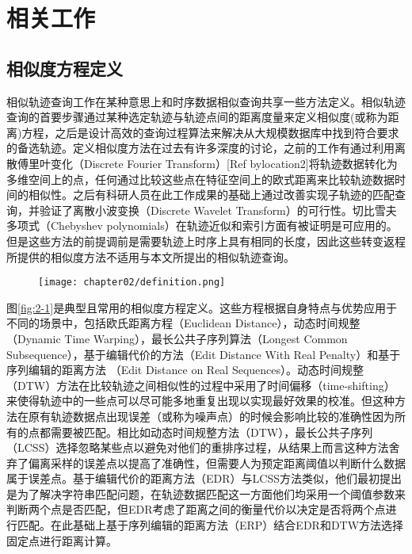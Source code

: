 
\chapter{ 相关工作 }
\label{chap:related}

\section{相似度方程定义}
\label{sec:similarityfunc}
相似轨迹查询工作在某种意思上和时序数据相似查询共享一些方法定义。相似轨迹查询的首要步骤通过某种选定轨迹与轨迹点间的距离度量来定义相似度(或称为距离)方程，之后是设计高效的查询过程算法来解决从大规模数据库中找到符合要求的备选轨迹。定义相似度方法在过去有许多深度的讨论，之前的工作有通过利用离散傅里叶变化（Discrete Fourier Transform）[Ref bylocation2]将轨迹数据转化为多维空间上的点，任何通过比较这些点在特征空间上的欧式距离来比较轨迹数据时间的相似性。之后有科研人员在此工作成果的基础上通过改善实现子轨迹的匹配查询，并验证了离散小波变换（Discrete Wavelet Transform）的可行性。切比雪夫多项式（Chebyshev polynomials）在轨迹近似和索引方面有被证明是可应用的。但是这些方法的前提调前是需要轨迹上时序上具有相同的长度，因此这些转变返程所提供的相似度方法不适用与本文所提出的相似轨迹查询。
\\

\begin{figure}[!htp]
  \centering
  \texttt{[image: chapter02/definition.png]}
\end{figure}

图\ref{fig:2-1}是典型且常用的相似度方程定义。这些方程根据自身特点与优势应用于不同的场景中，包括欧氏距离方程（Euclidean Distance），动态时间规整（Dynamic Time Warping），最长公共子序列算法（Longest Common Subsequence），基于编辑代价的方法（Edit Distance With Real Penalty）和基于序列编辑的距离方法 （Edit Distance on Real Sequences）。动态时间规整（DTW）方法在比较轨迹之间相似性的过程中采用了时间偏移（time-shifting）来使得轨迹中的一些点可以尽可能多地重复出现以实现最好效果的校准。但这种方法在原有轨迹数据点出现误差（或称为噪声点）的时候会影响比较的准确性因为所有的点都需要被匹配。相比如动态时间规整方法（DTW），最长公共子序列（LCSS）选择忽略某些点以避免对他们的重排序过程，从结果上而言这种方法舍弃了偏离采样的误差点以提高了准确性，但需要人为预定距离阈值以判断什么数据属于误差点。基于编辑代价的距离方法（EDR）与LCSS方法类似，他们最初提出是为了解决字符串匹配问题，在轨迹数据匹配这一方面他们均采用一个阈值参数来判断两个点是否匹配，但EDR考虑了距离之间的衡量代价以决定是否将两个点进行匹配。在此基础上基于序列编辑的距离方法（ERP）结合EDR和DTW方法选择固定点进行距离计算。

